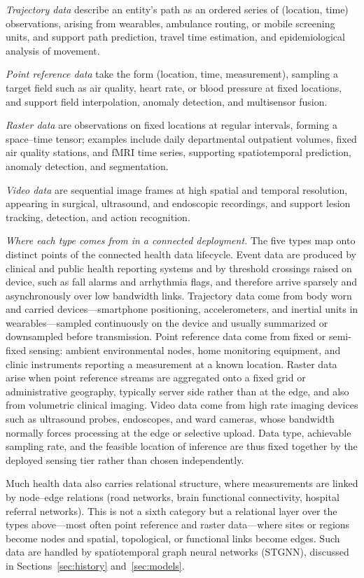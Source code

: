 \documentclass[journal]{IEEEtran}
\begin{document}
\emph{Trajectory data} describe an entity's path as an ordered series of (location, time) observations, arising from wearables, ambulance routing, or mobile screening units, and support path prediction, travel time estimation, and epidemiological analysis of movement.

\emph{Point reference data} take the form (location, time, measurement), sampling a target field such as air quality, heart rate, or blood pressure at fixed locations, and support field interpolation, anomaly detection, and multisensor fusion.

\emph{Raster data} are observations on fixed locations at regular intervals, forming a space--time tensor; examples include daily departmental outpatient volumes, fixed air quality stations, and fMRI time series, supporting spatiotemporal prediction, anomaly detection, and segmentation.

\emph{Video data} are sequential image frames at high spatial and temporal resolution, appearing in surgical, ultrasound, and endoscopic recordings, and support lesion tracking, detection, and action recognition.

\emph{Where each type comes from in a connected deployment.} The five types map onto distinct points of the connected health data lifecycle. Event data are produced by clinical and public health reporting systems and by threshold crossings raised on device, such as fall alarms and arrhythmia flags, and therefore arrive sparsely and asynchronously over low bandwidth links. Trajectory data come from body worn and carried devices---smartphone positioning, accelerometers, and inertial units in wearables---sampled continuously on the device and usually summarized or downsampled before transmission. Point reference data come from fixed or semi-fixed sensing: ambient environmental nodes, home monitoring equipment, and clinic instruments reporting a measurement at a known location. Raster data arise when point reference streams are aggregated onto a fixed grid or administrative geography, typically server side rather than at the edge, and also from volumetric clinical imaging. Video data come from high rate imaging devices such as ultrasound probes, endoscopes, and ward cameras, whose bandwidth normally forces processing at the edge or selective upload. Data type, achievable sampling rate, and the feasible location of inference are thus fixed together by the deployed sensing tier rather than chosen independently.

Much health data also carries relational structure, where measurements are linked by node--edge relations (road networks, brain functional connectivity, hospital referral networks). This is not a sixth category but a relational layer over the types above---most often point reference and raster data---where sites or regions become nodes and spatial, topological, or functional links become edges. Such data are handled by spatiotemporal graph neural networks (STGNN), discussed in Sections~\ref{sec:history} and~\ref{sec:models}.
\end{document}
